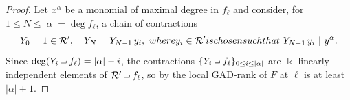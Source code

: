\documentclass[10pt,a4paper]{amsart}
\def\R{\mathcal{R}}
\def\a{\alpha}
\newcommand{\contract}{\mathbin{\mathpalette\dointprod\relax}}
\newcommand{\dointprod}[2]{%
  \raisebox{\depth}{\scalebox{1}[-1]{$#1\lnot$}}}
\renewcommand{\k}{\Bbbk}
\begin{document}
\begin{proof}
    Let $x^{\a}$ be a monomial of maximal degree in $f_{\ell}$ and consider, for $1 \leq N \leq |\a| = \deg f_{\ell}$, a chain of contractions
    \[ Y_0 = 1 \in \R', \quad Y_{N} = Y_{N-1}\,y_i, \ \textnormal{ where } y_i \in \R' \textnormal{ is chosen such that } \ Y_{N-1}\,y_i \ | \ y^{\a}. \]
    Since $\deg (Y_i \contract f_{\ell}) = |\a|-i$, the contractions $\{Y_i \contract f_{\ell} \}_{0 \leq i \leq |\a|}$ are $\k$-linearly independent elements of $\R' \contract f_{\ell}$, so by  the local GAD-rank of $F$ at $\ell$ is at least $|\a|+1$.
\end{proof}
\end{document}
